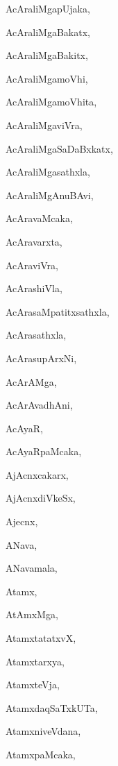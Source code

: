 \begin{multicols}{2}
{AcAraliMgapUjaka}, \pageref{AcAraliMgapUjaka}

{AcAraliMgaBakatx}, \pageref{AcAraliMgaBakatx}

{AcAraliMgaBakitx}, \pageref{AcAraliMgaBakitx}

{AcAraliMgamoVhi}, \pageref{AcAraliMgamoVhi}

{AcAraliMgamoVhita}, \pageref{AcAraliMgamoVhita}

{AcAraliMgaviVra}, \pageref{AcAraliMgaviVra}

{AcAraliMgaSaDaBxkatx}, \pageref{AcAraliMgaSaDaBxkatx}

{AcAraliMgasathxla}, \pageref{AcAraliMgasathxla}

{AcAraliMgAnuBAvi}, \pageref{AcAraliMgAnuBAvi}

{AcAravaMcaka}, \pageref{AcAravaMcaka}

{AcAravarxta}, \pageref{AcAravarxta}

{AcAraviVra}, \pageref{AcAraviVra}

{AcArashiVla}, \pageref{AcArashiVla}

{AcArasaMpatitxsathxla}, \pageref{AcArasaMpatitxsathxla}

{AcArasathxla}, \pageref{AcArasathxla}

{AcArasupArxNi}, \pageref{AcArasupArxNi}

{AcArAMga}, \pageref{AcArAMga}

{AcArAvadhAni}, \pageref{AcArAvadhAni}

{AcAyaR}, \pageref{AcAyaR}

{AcAyaRpaMcaka}, \pageref{AcAyaRpaMcaka}

{AjAcnxcakarx}, \pageref{AjAcnxcakarx}

{AjAcnxdiVkeSx}, \pageref{AjAcnxdiVkeSx}

{Ajecnx}, \pageref{Ajecnx}

{ANava}, \pageref{ANava}

{ANavamala}, \pageref{ANavamala}

{Atamx}, \pageref{Atamx}

{AtAmxMga}, \pageref{AtAmxMga}

{AtamxtatatxvX}, \pageref{AtamxtatatxvX}

{Atamxtarxya}, \pageref{Atamxtarxya}

{AtamxteVja}, \pageref{AtamxteVja}

{AtamxdaqSaTxkUTa}, \pageref{AtamxdaqSaTxkUTa}

{AtamxniveVdana}, \pageref{AtamxniveVdana}

{AtamxpaMcaka}, \pageref{AtamxpaMcaka}


\end{multicols}
